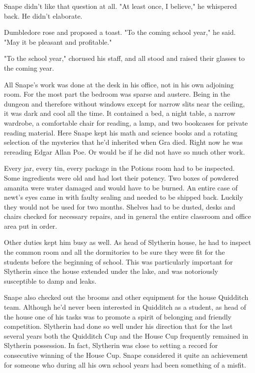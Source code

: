 Snape didn't like that question at all. "At least once, I believe," he whispered back. He didn't elaborate.

Dumbledore rose and proposed a toast. "To the coming school year," he said. "May it be pleasant and profitable."

"To the school year," chorused his staff, and all stood and raised their glasses to the coming year.

All Snape's work was done at the desk in his office, not in his own adjoining room. For the most part the bedroom was sparse and austere. Being in the dungeon and therefore without windows except for narrow slits near the ceiling, it was dark and cool all the time. It contained a bed, a night table, a narrow wardrobe, a comfortable chair for reading, a lamp, and two bookcases for private reading material. Here Snape kept his math and science books and a rotating selection of the mysteries that he'd inherited when Gra died. Right now he was rereading Edgar Allan Poe. Or would be if he did not have so much other work.

Every jar, every tin, every package in the Potions room had to be inspected. Some ingredients were old and had lost their potency. Two boxes of powdered amanita were water damaged and would have to be burned. An entire case of newt's eyes came in with faulty sealing and needed to be shipped back. Luckily they would not be used for two months. Shelves had to be dusted, desks and chairs checked for necessary repairs, and in general the entire classroom and office area put in order.

Other duties kept him busy as well. As head of Slytherin house, he had to inspect the common room and all the dormitories to be sure they were fit for the students before the beginning of school. This was particularly important for Slytherin since the house extended under the lake, and was notoriously susceptible to damp and leaks.

Snape also checked out the brooms and other equipment for the house Quidditch team. Although he'd never been interested in Quidditch as a student, as head of the house one of his tasks was to promote a spirit of belonging and friendly competition. Slytherin had done so well under his direction that for the last several years both the Quidditch Cup and the House Cup frequently remained in Slytherin possession. In fact, Slytherin was close to setting a record for consecutive winning of the House Cup. Snape considered it quite an achievement for someone who during all his own school years had been something of a misfit.

